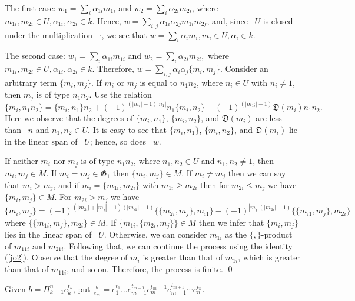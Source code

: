 \documentclass[secthm,seceqn,amsthm,ussrhead,reqno,12pt]{amsart}
\theoremstyle{plain}
\begin{document}
The first case:
$w_1=\sum_i \alpha_{1i} m_{1i}$
and
$w_2=\sum_i \alpha_{2i} m_{2i}$,
where
$m_{1i},m_{2i} \in U, \alpha_{1i}, \alpha_{2i} \in k$.
Hence,
$w=\sum_{i,j} \alpha_{1i}\alpha_{2j}  m_{1i}m_{2j}$,
and,
since~%
$U$
is closed under the multiplication~%
$\cdot$,
we see that
$w=\sum_i \alpha_i m_i, m_i \in U, \alpha_i \in k$.

The second case:
$w_1=\sum_i \alpha_{1i} m_{1i}$
and
$w_2=\sum_i \alpha_{2i} m_{2i},$
where
$m_{1i},m_{2i} \in U,\alpha_{1i}, \alpha_{2i} \in k$.
Therefore,
$w=\sum_{i,j} \alpha_i \alpha_j \{m_{i},m_{j}\}$.
Consider an arbitrary term
$\{m_i,m_j\}$. 
If
$m_i$
or
$m_j$
is equal to
$n_1n_2$,
where
$n_i \in U$
with
$n_i \neq 1$,
then %
$m_j$
is of type
$n_1n_2$.
Use the relation
$$
\{m_i,n_1n_2\}= \{m_i,n_1\}n_2+(-1)^{(|m_i|-1)|n_1|}n_1\{m_i,n_2\}+(-1)^{(|m_{1i}|-1)}{{\mathfrak D}(m_i)n_1n_2}.
$$
Here we observe that
the degrees of %
$\{m_i,n_1\}$,
$\{m_i,n_2\}$,
and
${\mathfrak D}(m_i)$
are less than~%
$n$
and
$n_1,n_2 \in U$.
It is easy to see that
$\{m_i,n_1\}$,
$\{m_i,n_2\}$,
and
${\mathfrak D}(m_i)$
lie in the linear span
of~%
$U$;
hence,
so does~%
$w$.

If neither
$m_i$
nor
$m_j$
is of type
$n_1n_2$,
where
$n_1,n_2 \in U$
and
$n_1,n_2 \neq 1$, 
then
$m_i,m_j \in M$.
If
$m_i=m_j \in{\mathfrak G}_1$
then
$\{m_i,m_j\} \in M$.
If  
$m_i \neq m_j$
then
we can say that
$m_i>m_j$,
and if
$m_i=\{m_{1i},m_{2i}\}$
with
$m_{1i}\geq m_{2i}$
then for
$m_{2i}\leq m_j$
we have
$\{m_i,m_j\} \in M$.
For
$m_{2i}>m_j$
we have  %
\begin{equation} \label{after}
\{m_i,m_j\} = (-1)^{(|m_{2i}|+ |m_j| -1)(|m_{i1}|-1)}\{\{m_{2i}, m_j\}, m_{i1}\}- (-1)^{|m_j|(|m_{2i}|-1)}\{\{m_{i1}, m_j\}, m_{2i}\}
\end{equation}
where
$\{\{m_{1i},m_j\},m_{2i}\} \in M$.
If
$\{m_{1i},\{m_{2i},m_j\}\} \in M$
then we infer that 
$\{m_i,m_j\}$
lies in the linear span
of~%
$U$.
Otherwise,
we can consider
$m_{1i}$
as the
$\{,\}$-product of
$m_{11i}$
and
$m_{21i}$.
Following that,
we can continue the process
using the identity (\ref{jo2}).
Observe that 
the degree of
$m_{i}$
is greater than that of
$m_{1i}$,
which
is greater than that of
$m_{11i}$,
and so on.
Therefore,
the process is finite.
\qed

\medskip


Given
$b=\Pi_{k=1}^n e_k^{t_k}$,
put
$\frac{b}{e_m}=e_1^{t_1} \ldots e_{m-1}^{t_{m-1}}e_m^{t_m-1} e_{m+1}^{t_{m+1}}\cdots e_n^{t_n}$.
\end{document}
